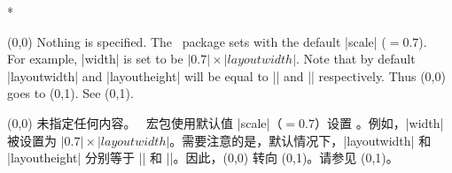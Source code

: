 \begin{Spec}
\begin{paracol}{2}
\switchcolumn[0]*\item[\Ss(0,0)]
 Nothing is specified. The \Gm\ package sets  with the
 default |scale| ($=0.7$). \\ For example, |width| is set to be
 $|0.7|\times|layoutwidth|$. Note that by default |layoutwidth| 
 and |layoutheight| will be equal to |\paperwidth| and |\paperheight|
 respectively.
 Thus \Ss(0,0) goes to \Ss(0,1). See \Ss(0,1).
 \bigskip
 \switchcolumn
 \item[\Ss(0,0)]
 未指定任何内容。 \Gm\ 宏包使用默认值 |scale|（$=0.7$）设置 。例如，|width| 被设置为 $|0.7|\times|layoutwidth|$。需要注意的是，默认情况下，|layoutwidth| 和 |layoutheight| 分别等于 |\paperwidth| 和 |\paperheight|。因此，\Ss(0,0) 转向 \Ss(0,1)。请参见 \Ss(0,1)。
 \bigskip


\end{paracol}
\end{Spec}
